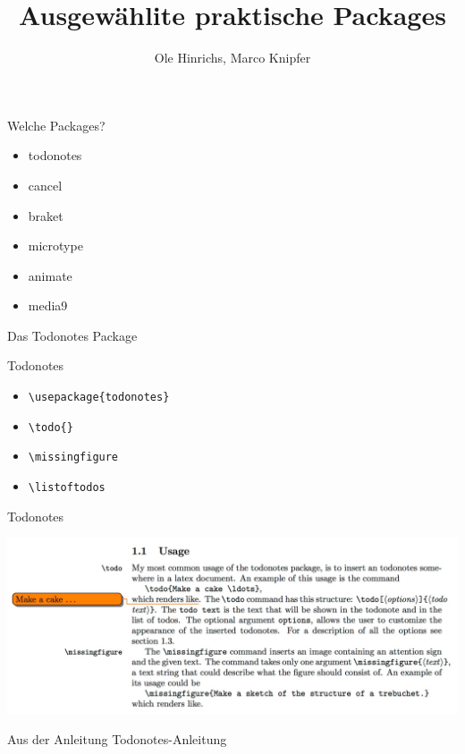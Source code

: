 \documentclass[hyperref={pdfpagelabels=false}]{beamer}
\title[\LaTeX-Einführung]{Ausgewählite praktische Packages}
\institute{Fachschaft Physik}
\author[Ole, Marco]{Ole Hinrichs, Marco Knipfer}
\begin{document}
 
\begin{frame}{Welche Packages?}
    \begin{block}{}
        \begin{itemize}
            \item todonotes
            \item cancel
            \item braket
            \item microtype
            \item animate
            \item media9 
        \end{itemize}
    \end{block}
\end{frame}
\begin{frame}[fragile]{Das Todonotes Package}
    \begin{block}{Todonotes}
        \begin{itemize}
            \item \verb!\usepackage{todonotes}!
            \item \verb!\todo{}!
            \item \verb!\missingfigure!
            \item \verb!\listoftodos!
        \end{itemize}
    \end{block}
\end{frame}
\begin{frame}[fragile]{Todonotes}
    \begin{center}
        \includegraphics[width = \textwidth]{figures/todo.pdf}
        \newline
    \end{center}
        Aus der Anleitung Todonotes-Anleitung
\end{frame}
\end{document}
